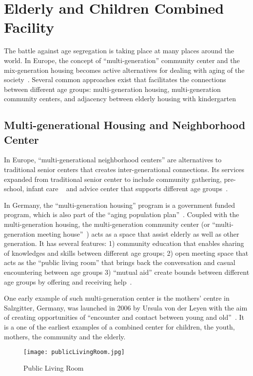 \section{Elderly and Children Combined Facility}
The battle against age segregation is taking place at many places
around the world. In Europe, the concept of ``multi-generation''
community center and the mix-generation housing becomes active
alternatives for dealing with aging of the
society~\cite{Fromm2015}. Several common approaches exist that
facilitates the connections between different age groups:
multi-generation housing, multi-generation community centers, and
adjacency between elderly housing with kindergarten

\subsection{Multi-generational Housing and Neighborhood Center}
In Europe, ``multi-generational neighborhood centers'' are
alternatives to traditional senior centers that creates
inter-generational connections. Its services expanded from traditional
senior center to include community gathering, pre-school, infant care
~\cite{Fromm2015} and advice center that supports different age
groups~\cite{Smith2014}. 

In Germany, the ``multi-generation housing'' program is a government
funded program, which is also part of the ``aging population
plan''~\cite{Smith2014}. Coupled with the multi-generation housing,
the multi-generation community center (or ``multi-generation meeting
house''~\cite{Smith2014}) acts as a space that assist elderly as well
as other generation. It has several features: 1) community education
that enables sharing of knowledges and skills between different age
groups; 2) open meeting space that acts as the ``public living room''
that brings back the conversation and casual encountering between age
groups 3) ``mutual aid'' create bounds between different age groups by
offering and receiving help~\cite{Smith2014}.

One early example of such multi-generation center is the mothers'
centre in Salzgitter, Germany, was launched in 2006 by Ursula von der
Leyen with the aim of creating opportunities of ``encounter and
contact between young and old''~\cite{Smith2014}. It is a one of the
earliest examples of a combined center for children, the youth,
mothers, the community and the elderly. 

\begin{figure}[htbp]
  \centering
  \texttt{[image: publicLivingRoom.jpg]}
  \caption[Public Living Room]{Public Living Room~\cite{Smith2014}}
  \label{fig:publicLivingRoom}
\end{figure}

